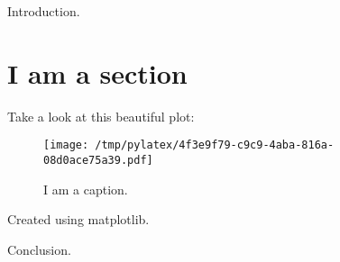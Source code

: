 \documentclass{article}%
\begin{document}
%
\normalsize%
Introduction.%
\section{I am a section}%
Take a look at this beautiful plot:%


\begin{figure}[htbp]%
\centering%
\texttt{[image: /tmp/pylatex/4f3e9f79-c9c9-4aba-816a-08d0ace75a39.pdf]}%
\caption{I am a caption.}%
\end{figure}

%
Created using matplotlib.

%
Conclusion.%
\end{document}
